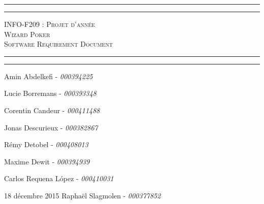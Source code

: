 \begin{titlepage}

\begin{center}
    \vspace*{\fill}
        \hrule
        \vspace*{2pt}
        \hrule
        \vspace*{15pt}
        \textsc{\Huge{INFO-F209 : Projet d'année \\\vspace*{8pt}
            Wizard Poker\\\vspace*{12pt}
            Software Requirement Document}}
        \vspace*{15pt}
        \hrule
        \vspace*{2pt}
        \hrule
  \vspace*{\fill}
\end{center}
\null
\vfill

\large
\hfill Amin Abdelkefi - \emph{000394225}

\hfill Lucie Borremans - \emph{000393348}

\hfill Corentin Candeur - \emph{000411488}

\hfill Jonas Descurieux - \emph{000382867}

\hfill Rémy Detobel - \emph{000408013}

\hfill Maxime Dewit - \emph{000394939}

\hfill Carlos Requena López - \emph{000410031}

18 décembre 2015 \hfill Raphaël Slagmolen - \emph{000377852}


\end{titlepage}
